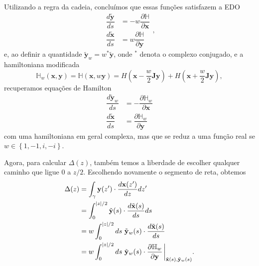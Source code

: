 \documentclass[
	12pt,
	oneside,			%
	a4paper,			%
	english,			%
	brazil				%
	]{abntex2}
\theoremstyle{definition}
\begin{document}
Utilizando a regra da cadeia, concluímos que essas funções satisfazem a EDO
\begin{equation}
    \begin{aligned}
        \dfrac{d \tilde{\mathbf{y}}}{ds} &= -w\dfrac{\partial \mathbb{H}}{\partial \mathbf{x}} \\
        \dfrac{d \tilde{\mathbf{x}}}{ds} &= w\dfrac{\partial \mathbb{H}}{\partial \mathbf{y}} 
    \end{aligned},
\end{equation}
e, ao definir a quantidade $\tilde{\mathbf{y}}_w = w^* \tilde{\mathbf{y}}$, onde $^*$ denota o complexo conjugado, e a hamiltoniana modificada
\begin{equation}
    \mathbb{H}_{w}\left(\mathbf{x},\mathbf{y}\right) =  \mathbb{H}\left(\mathbf{x},w\mathbf{y}\right) = H\left( \mathbf{x} - \frac{w}{2}\mathbf{J} \mathbf{y} \right) + H\left( \mathbf{x} + \frac{w}{2}\mathbf{J} \mathbf{y} \right),
\end{equation}
recuperamos equações de Hamilton
\begin{equation}
    \begin{aligned}
        \dfrac{d \tilde{\mathbf{y}}_w}{ds} &= -\dfrac{\partial \mathbb{H}_{w}}{\partial \mathbf{x}} \\
        \dfrac{d \tilde{\mathbf{x}}}{ds} &= \dfrac{\partial\mathbb{H}_{w}}{\partial \mathbf{y}}
    \end{aligned}
\end{equation}
com uma hamiltoniana em geral complexa, mas que se reduz a uma função real se $w \in \left\{ 1,-1,i,-i \right\}$.

Agora, para calcular $\Delta(z)$, também temos a liberdade de escolher qualquer caminho que ligue $0$ a $z/2$. Escolhendo novamente o segmento de reta, obtemos
\begin{equation}
\label{formula integral área}
    \begin{aligned}
        \Delta(z) &= \int_\gamma \mathbf{y}(z') \cdot \frac{d\mathbf{x}(z')}{dz} dz' \\
        &= \int_{0}^{|z|/2} \tilde{ \mathbf{y}}(s) \cdot \frac{d\tilde{ \mathbf{x}}(s)}{ds} ds \\
        &= w\int_{0}^{|z|/2} ds \ \tilde{ \mathbf{y}}_w(s) \cdot \frac{d\tilde{ \mathbf{x}}(s)}{ds}  \\
        &= w\int_{0}^{|z|/2} ds \ \tilde{ \mathbf{y}}_w(s) \cdot \dfrac{\partial\mathbb{H}_{w}}{\partial \mathbf{y}} \eval_{\tilde{\mathbf{x}}(s),\tilde{\mathbf{y}}_w(s)}.
    \end{aligned}
\end{equation}
\end{document}
